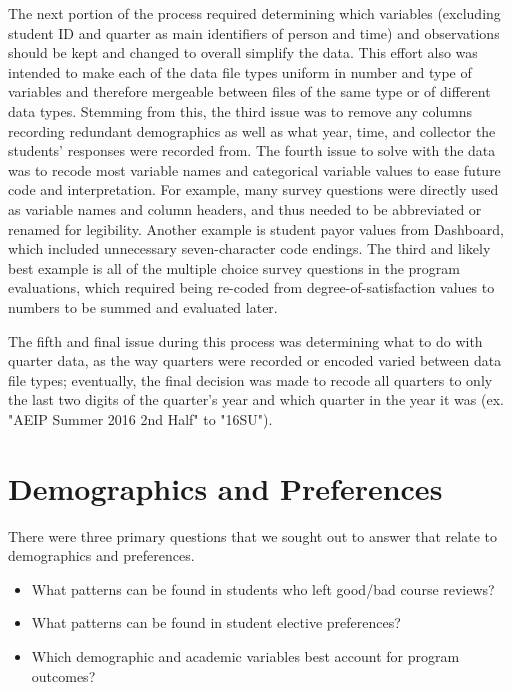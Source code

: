 \documentclass[12pt,letterpaper]{article}
\begin{document}
The next portion of the process required determining which variables (excluding student ID and quarter as main identifiers of person and time) and observations should be kept and changed to overall simplify the data. This effort also was intended to make each of the data file types uniform in number and type of variables and therefore mergeable between files of the same type or of different data types. Stemming from this, the third issue was to remove any columns recording redundant demographics as well as what year, time, and collector the students’ responses were recorded from. The fourth issue to solve with the data was to recode most variable names and categorical variable values to ease future code and interpretation. For example, many survey questions were directly used as variable names and column headers, and thus needed to be abbreviated or renamed for legibility. Another example is student payor values from Dashboard, which included unnecessary seven-character code endings. The third and likely best example is all of the multiple choice survey questions in the program evaluations, which required being re-coded from degree-of-satisfaction values to numbers to be summed and evaluated later.

The fifth and final issue during this process was determining what to do with quarter data, as the way quarters were recorded or encoded varied between data file types; eventually, the final decision was made to recode all quarters to only the last two digits of the quarter’s year and which quarter in the year it was (ex. "AEIP Summer 2016 2nd Half" to "16SU").

\newpage

\section{Demographics and Preferences}

There were three primary questions that we sought out to answer that relate to demographics and preferences.

\begin{itemize}
    \item What patterns can be found in students who left good/bad course reviews?
    \item What patterns can be found in student elective preferences?
    \item Which demographic and academic variables best account for program outcomes?
\end{itemize}
\end{document}

